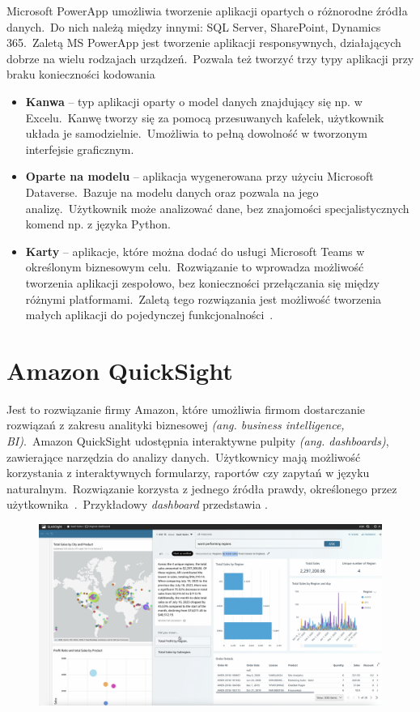 Microsoft PowerApp umożliwia tworzenie aplikacji opartych o różnorodne źródła danych.\ Do nich należą między innymi: SQL Server, SharePoint, Dynamics 365.\ Zaletą MS PowerApp jest tworzenie aplikacji responsywnych, działających dobrze na wielu rodzajach urządzeń.\ Pozwala też tworzyć trzy typy aplikacji przy braku konieczności kodowania

\begin{itemize}
    \item \textbf{Kanwa} -- typ aplikacji oparty o model danych znajdujący się np. w Excelu.\ Kanwę tworzy się za pomocą przesuwanych kafelek, użytkownik układa je samodzielnie.\ Umożliwia to pełną dowolność w tworzonym interfejsie graficznym.

    \item \textbf{Oparte na modelu} -- aplikacja wygenerowana przy użyciu Microsoft Dataverse.\ Bazuje na modelu danych oraz pozwala na jego analizę.\ Użytkownik może analizować dane, bez znajomości specjalistycznych komend np. z języka Python.

    \item \textbf{Karty} -- aplikacje, które można dodać do usługi Microsoft Teams w określonym biznesowym celu.\ Rozwiązanie to wprowadza możliwość tworzenia aplikacji zespołowo, bez konieczności przełączania się między różnymi platformami.\ Zaletą tego rozwiązania jest możliwość tworzenia małych aplikacji do pojedynczej funkcjonalności~\cite{Microsoft,Microsofta,Microsoftb,Microsoftc}.
\end{itemize}

\section{Amazon QuickSight}
Jest to rozwiązanie firmy Amazon, które umożliwia firmom dostarczanie rozwiązań z zakresu analityki biznesowej \textit{(ang. business intelligence, BI)}.\ Amazon QuickSight udostępnia interaktywne pulpity \textit{(ang. dashboards)}, zawierające narzędzia do analizy danych.\ Użytkownicy mają możliwość korzystania z interaktywnych formularzy, raportów czy zapytań w języku naturalnym.\ Rozwiązanie korzysta z jednego źródła prawdy, określonego przez użytkownika~\cite{AmazonQuickSight}.\ Przykładowy \textit{dashboard} przedstawia .
\begin{figure}[H]
    \centering
    \includegraphics[width=\textwidth]{images/amazon_qs}
    \label{fig:am-qs}
\end{figure}
\vfill
\clearpage

